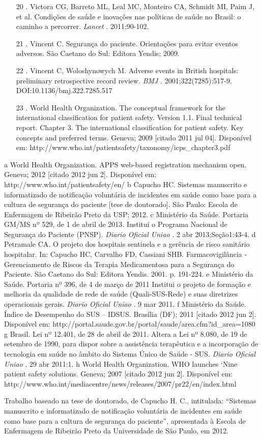 \documentclass{article}
\begin{document}
\begin{itemize}
\item[20] . Victora CG, Barreto ML, Leal MC, Monteiro CA, Schmidt MI, Paim J, et
al.
Condições de saúde e inovações nas políticas de saúde no Brasil: o caminho a
percorrer.
\textit{Lancet}
. 2011;90-102.

\item[21] . Vincent C. Segurança do paciente. Orientações para evitar eventos
adversos. São Caetano do Sul: Editora Yendis; 2009.

\item[22] . Vincent C, Woloshynowych M. Adverse events in British hospitals:
preliminary retrospective record review. \textit{BMJ}
. 2001;322(7285):517-9.
DOI:10.1136/bmj.322.7285.517

\item[23] . World Health Organization. The conceptual framework for the
international
classification for patient safety. Version 1.1. Final technical report. Chapter
3. The
international classification for patient safety. Key concepts and preferred
terms. Geneva;
2009 [citado 2011 jul 04]. Disponível em:
http://www.who.int/patientsafety/taxonomy/icps\_{}chapter3.pdf

\end{itemize}
a
World Health Organization. APPS web-based registration mechanism open. Geneva;
2012
[citado 2012 jun 2]. Disponível em: http://www.who.int/patientsafety/en/
b
Capucho HC. Sistemas manuscrito e informatizado de notificação voluntária de
incidentes
em saúde como base para a cultura de segurança do paciente [tese de doutorado].
São Paulo:
Escola de Enfermagem de Ribeirão Preto da USP; 2012.
c
Ministério da Saúde. Portaria GM/MS nº 529, de 1 de abril de 2013. Institui o
Programa
Nacional de Segurança do Paciente (PNSP). \textit{Diario Oficial Uniao}
. 2 abr
2013;Seção1:43-4.
d
Petramale CA. O projeto dos hospitais sentinela e a gerência de risco sanitário
hospitalar. In: Capucho HC, Carvalho FD, Cassiani SHB. Farmacovigilância -
Gerenciamento
de Riscos da Terapia Medicamentosa para a Segurança do Paciente. São Caetano do
Sul:
Editora Yendis. 2001. p. 191-224.
e
Ministério da Saúde. Portaria nº 396, de 4 de março de 2011 Institui o projeto
de
formação e melhoria da qualidade de rede de saúde (Quali-SUS-Rede) e suas
diretrizes
operacionais gerais. \textit{Diario Oficial Uniao}
. 9 mar 2011.
f
Ministério da Saúde. Índice de Desempenho do SUS – IDSUS. Brasília (DF); 2011
[citado
2012 jun 2]. Disponível em:
http://portal.saude.gov.br/portal/saude/area.cfm?id\_{}area=1080
g
Brasil. Lei nº 12.401, de 28 de abril de 2011. Altera a Lei nº 8.080, de 19 de
setembro
de 1990, para dispor sobre a assistência terapêutica e a incorporação de
tecnologia em
saúde no âmbito do Sistema Único de Saúde - SUS. \textit{Diario Oficial Uniao}
.
29 abr 2011:1.
h
World Health Organization. WHO launches ‘Nine patient safety solutions. Geneva;
2007
[citado 2012 jun 2]. Disponível em:
http://www.who.int/mediacentre/news/releases/2007/pr22/en/index.html

Trabalho baseado na tese de doutorado, de Capucho H. C., intitulada: “Sistemas
manuscrito
e informatizado de notificação voluntária de incidentes em saúde como base para
a cultura
de segurança do paciente”, apresentada à Escola de Enfermagem de Ribeirão Preto
da
Universidade de São Paulo, em 2012.
\end{document}
